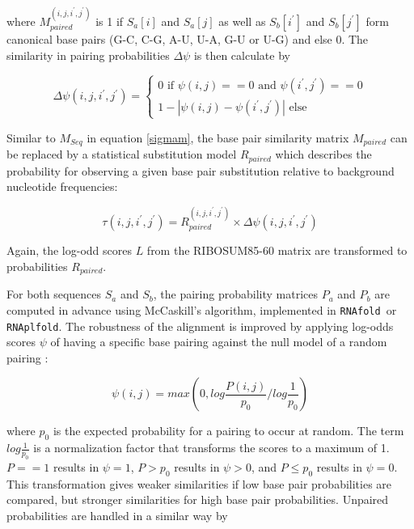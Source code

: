 \documentclass{bmcart}
\begin{document}
\noindent where $M_{paired}^{(i,j,i^\prime,j^\prime)}$ is 1 if $S_a[i]$ and $S_a[j]$ as
well as $S_b[i^\prime]$ and $S_b[j^\prime]$ form canonical base pairs (G-C, C-G,
A-U, U-A, G-U or U-G) and else 0. The similarity in pairing probabilities
$\Delta \psi$ is then calculate by

\begin{equation}\label{eq9}
	\Delta \psi(i,j,i^\prime,j^\prime) = \left\{ \begin{array}{l}
			0 \textrm{ if }\psi(i,j) == 0 
			  \textrm{ and }\psi(i^\prime,j^\prime) == 0 \\
		1 - | \psi(i,j) - \psi(i^\prime,j^\prime) | \textrm{ else}
		\end{array}\right.
\end{equation}

\noindent Similar to $M_{Seq}$ in equation \ref{sigmam}, the base pair similarity matrix
$M_{paired}$ can be replaced by a statistical substitution model $R_{paired}$
which describes the probability for observing a given base pair substitution
relative to background nucleotide frequencies:

\begin{equation}\label{eq10}
	\tau(i,j,i^\prime,j^\prime) = R_{paired}^{(i,j,i^\prime,j^\prime)}
\times \Delta \psi(i,j,i^\prime,j^\prime)
\end{equation}

\noindent Again, the log-odd scores $L$ from the RIBOSUM85-60 matrix \cite{Klein14499004}
are transformed to probabilities $R_{paired}$.

\noindent For both sequences $S_a$ and $S_b$, the pairing probability matrices $P_a$ and
$P_b$ are computed in advance using McCaskill's algorithm, implemented in
\texttt{RNAfold }or \texttt{RNAplfold}. The robustness of the alignment is improved by applying
log-odds scores $\psi$ of having a specific base pairing against the null model
of a random pairing \cite{Will17432929}:

\begin{equation}\label{eq11}
	\psi(i,j) = max \left( 0, log \frac{P(i,j)}{p_0} / log \frac{1}{p_0} \right)
\end{equation}

\noindent where $p_0$ is the expected probability for a pairing to occur at random. The
term $log \frac{1}{p_0}$ is a normalization factor that transforms the scores to
a maximum of 1. $P==1$ results in $\psi=1$, $P>p_0$ results in $\psi>0$, and $P\le
p_0$ results in $\psi=0$.  This transformation gives weaker similarities if low
base pair probabilities are compared, but stronger similarities for high base pair
probabilities. Unpaired probabilities are handled in a similar way by
\end{document}
